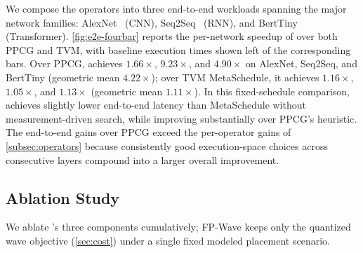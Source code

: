 We compose the operators into three end-to-end workloads spanning the major network families: AlexNet~\cite{alexnet} (CNN), Seq2Seq~\cite{lstm} (RNN), and BertTiny~\cite{bert} (Transformer).  \autoref{fig:e2e-fourbar} reports the per-network speedup of \name over both PPCG and TVM, with baseline execution times shown left of the corresponding bars. Over PPCG, \name achieves $1.66\times$, $9.23\times$, and $4.90\times$ on AlexNet, Seq2Seq, and BertTiny (geometric mean $4.22\times$); over TVM MetaSchedule, it achieves $1.16\times$, $1.05\times$, and $1.13\times$ (geometric mean $1.11\times$). In this fixed-schedule comparison, \name achieves slightly lower end-to-end latency than MetaSchedule without measurement-driven search, while improving substantially over PPCG's heuristic. The end-to-end gains over PPCG exceed the per-operator gains of \autoref{subsec:operators} because consistently good execution-space choices across consecutive layers compound into a larger overall improvement.

\FloatBarrier
\subsection{Ablation Study}
\label{subsec:ablation}

We ablate \name's three components cumulatively; FP-Wave keeps only the quantized wave objective (\autoref{sec:cost}) under a single fixed modeled placement scenario.

